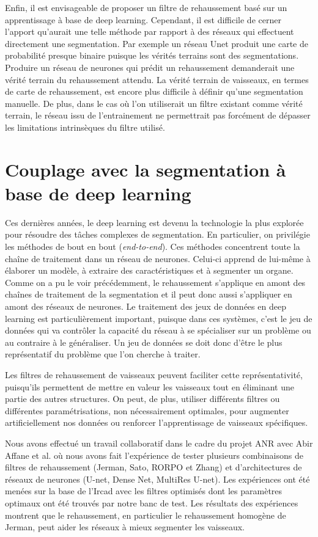 Enfin, il est envisageable de proposer un filtre de rehaussement basé sur un apprentissage à base de deep learning. Cependant, il est difficile de cerner l'apport qu'aurait une telle méthode par rapport à des réseaux qui effectuent directement une segmentation. Par exemple un réseau Unet produit une carte de probabilité presque binaire puisque les vérités terrains sont des segmentations. Produire un réseau de neurones qui prédit un rehaussement demanderait une vérité terrain du rehaussement attendu. La vérité terrain de vaisseaux, en termes de carte de rehaussement, est encore plus difficile à définir qu'une segmentation manuelle. De plus, dans le cas où l'on utiliserait un filtre existant comme vérité terrain, le réseau issu de l'entrainement ne permettrait pas forcément de dépasser les limitations intrinsèques du filtre utilisé.

\section{Couplage avec la segmentation à base de deep learning}

Ces dernières années, le deep learning est devenu la technologie la plus explorée pour résoudre des tâches complexes de segmentation. En particulier,  on privilégie les méthodes de bout en bout (\textit{end-to-end}). Ces méthodes concentrent toute la chaîne de traitement dans un réseau de neurones. Celui-ci apprend de lui-même à élaborer un modèle, à extraire des caractéristiques et à segmenter un organe. Comme on a pu le voir précédemment, le rehaussement s'applique en amont des chaînes de traitement de la segmentation et il peut donc aussi s'appliquer en amont des réseaux de neurones. Le traitement des jeux de données en deep learning est particulièrement important, puisque dans ces systèmes, c'est le jeu de données qui va contrôler la capacité du réseau à se spécialiser sur un problème ou au contraire à le généraliser. Un jeu de données se doit donc d'être le plus représentatif du problème que l'on cherche à traiter.

Les filtres de rehaussement de vaisseaux peuvent faciliter cette représentativité, puisqu'ils permettent de mettre en valeur les vaisseaux tout en éliminant une partie des autres structures. On peut, de plus, utiliser différents filtres ou différentes paramétrisations, non nécessairement optimales, pour augmenter artificiellement nos données ou renforcer l'apprentissage de vaisseaux spécifiques.

Nous avons effectué un travail collaboratif \cite{Affane_2022_article_commun} dans le cadre du projet ANR avec Abir Affane et al. où nous avons fait l'expérience de tester plusieurs combinaisons de filtres de rehaussement (Jerman, Sato, RORPO et Zhang) et d'architectures de réseaux de neurones (U-net, Dense Net, MultiRes U-net). Les expériences ont été menées sur la base de l'Ircad avec les filtres optimisés dont les paramètres optimaux ont été trouvés par notre banc de test. Les résultats des expériences montrent que le rehaussement, en particulier le rehaussement homogène de Jerman, peut aider les réseaux à mieux segmenter les vaisseaux.

